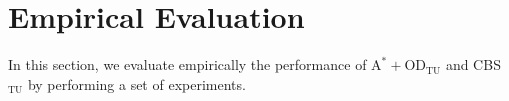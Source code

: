 \documentclass[jair,twoside,11pt,theapa]{article}
\newcommand{\odatu}{$\mathrm{A^{*}+OD_{TU}}$\xspace}
\newcommand{\cbstu}{CBS$\mathrm{_{TU}}$\xspace}
\begin{document}


\section{Empirical Evaluation}
\label{maptuResults}
In this section, we evaluate empirically the performance of \odatu and \cbstu by performing a set of experiments. 
\end{document}
